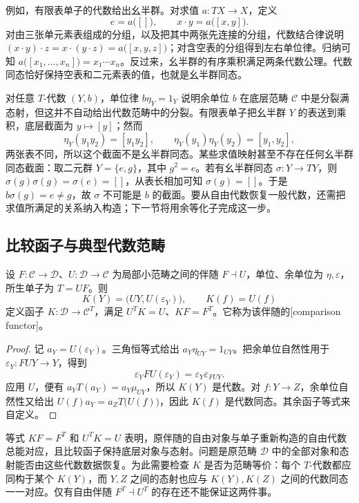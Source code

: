 例如，有限表单子的代数给出幺半群。对求值 \(a:TX\to X\)，定义
\[
	e=a\bigl([]\bigr),\qquad x\cdot y=a\bigl([x,y]\bigr).
\]
对由三张单元素表组成的分组，以及把其中两张先连接的分组，代数结合律说明 \((x\cdot y)\cdot z=x\cdot(y\cdot z)=a\bigl([x,y,z]\bigr)\)；对含空表的分组得到左右单位律。归纳可知 \(a\bigl([x_1,\ldots,x_n]\bigr)=x_1\cdots x_n\)。反过来，幺半群的有序乘积满足两条代数公理。代数同态恰好保持空表和二元素表的值，也就是幺半群同态。

\ProseParagraphBreak

对任意 \(T\)-代数 \((Y,b)\)，单位律 \(b\eta_Y=1_Y\) 说明余单位 \(b\) 在底层范畴 \(\mathcal C\) 中是分裂满态射，但这并不自动给出代数范畴中的分裂。有限表单子把幺半群 \(Y\) 的表送到乘积，底层截面为 \(y\mapsto[y]\)；然而
\[
	\eta_Y(y_1y_2)=[y_1y_2],\qquad \eta_Y(y_1)\eta_Y(y_2)=[y_1,y_2],
\]
两张表不同，所以这个截面不是幺半群同态。某些求值映射甚至不存在任何幺半群同态截面：取二元群 \(Y=\{e,g\}\)，其中 \(g^2=e\)。若有幺半群同态 \(\sigma:Y\rightarrow TY\)，则 \(\sigma(g)\sigma(g)=\sigma(e)=[]\)，从表长相加可知 \(\sigma(g)=[]\)。于是 \(b\sigma(g)=e\ne g\)，故 \(\sigma\) 不可能是 \(b\) 的截面。要从自由代数恢复一般代数，还需把求值所满足的关系纳入构造；下一节将用余等化子完成这一步。

\subsection{比较函子与典型代数范畴}
\label{b4:subsec:A02:03}

\begin{proposition}\label{b4:prop:A-comparison-functor}
	设 \(F:\mathcal C\to\mathcal D\)、\(U:\mathcal D\to\mathcal C\) 为局部小范畴之间的伴随 \(F\dashv U\)，单位、余单位为 \(\eta,\varepsilon\)，所生单子为 \(T=UF\)。则
	\[
		K(Y)=\bigl(UY,U(\varepsilon_Y)\bigr),\qquad K(f)=U(f)
	\]
	定义函子 \(K:\mathcal D\to\mathcal C^T\)，满足 \(U^TK=U\)、\(KF=F^T\)。它称为该伴随的[comparison functor]。
\end{proposition}
\begin{proof}
	记 \(a_Y=U(\varepsilon_Y)\)。三角恒等式给出 \(a_Y\eta_{UY}=1_{UY}\)。把余单位自然性用于 \(\varepsilon_Y:FUY\to Y\)，得到
	\[
		\varepsilon_YFU(\varepsilon_Y) =\varepsilon_Y\varepsilon_{FUY}.
	\]
	应用 \(U\)，便有 \(a_YT(a_Y)=a_Y\mu_{UY}\)，所以 \(K(Y)\) 是代数。对 \(f:Y\to Z\)，余单位自然性又给出 \(U(f)a_Y=a_ZT\bigl(U(f)\bigr)\)，因此 \(K(f)\) 是代数同态。其余函子等式来自定义。
\end{proof}

等式 \(KF=F^T\) 和 \(U^TK=U\) 表明，原伴随的自由对象与单子重新构造的自由代数总能对应，且比较函子保持底层对象与态射。问题是原范畴 \(\mathcal D\) 中的全部对象和态射能否由这些代数数据恢复。为此需要检查 \(K\) 是否为范畴等价：每个 \(T\)-代数都应同构于某个 \(K(Y)\)，而 \(Y,Z\) 之间的态射也应与 \(K(Y),K(Z)\) 之间的代数同态一一对应。仅有自由伴随 \(F^T\dashv U^T\) 的存在还不能保证这两件事。

